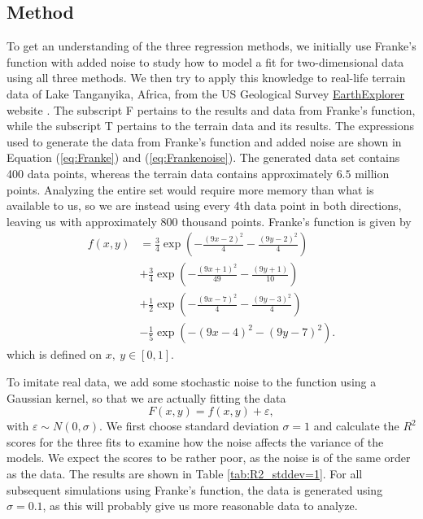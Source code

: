 \documentclass[a4paper, 10pt]{article}
\begin{document}
\begin{multicols}{2}
\section{Method}
To get an understanding of the three regression methods, we initially use Franke's function with added noise to study how to model a fit for two-dimensional data using all three methods. We then try to apply this knowledge to real-life terrain data of Lake Tanganyika, Africa, from the US Geological Survey \href{https://earthexplorer.usgs.gov/}{EarthExplorer}  website \cite{earthexplorer} .  The subscript F pertains to the results and data from Franke's function, while the subscript T pertains to the terrain data and its results.  The expressions used to generate the data from Franke's function and added noise are shown in Equation (\ref{eq:Franke}) and (\ref{eq:Frankenoise}). The generated data set contains 400 data points, whereas the terrain data contains approximately $6.5$ million points. Analyzing the entire set would require more memory than what is available to us, so we are instead using every 4th data point in both directions, leaving us with approximately 800 thousand points. 
Franke's function is given by
\begin{align}
f(x,y) &= \frac{3}{4}\exp{\left(-\frac{(9x-2)^2}{4}   - \frac{(9y-2)^2}{4}\right)} \nonumber\\
 &+\frac{3}{4}\exp{\left(-\frac{(9x+1)^2}{49}- \frac{(9y+1)}{10}\right)} \nonumber\\
 &+\frac{1}{2}\exp{\left(-\frac{(9x-7)^2}{4} - \frac{(9y-3)^2}{4}\right)} \nonumber\\
 &-\frac{1}{5}\exp{\left(-(9x-4)^2 - (9y-7)^2\right) }. \label{eq:Franke}
\end{align} which is defined on $x,\ y \in [0,1]$.

To imitate real data, we add some stochastic noise to the function using a Gaussian kernel, so that we are actually fitting the data 
\begin{equation}
F(x, y) = f(x, y) + \varepsilon \label{eq:Frankenoise},
\end{equation}
with $ \varepsilon \sim N(0, \sigma) $. We first choose standard deviation $\sigma=1$ and calculate the $R^2$ scores for the three fits to examine how the noise affects the variance of the models. We expect the scores to be rather poor, as the noise is of the same order as the data.  The results are shown in Table \ref{tab:R2_stddev=1}. For all subsequent simulations using Franke's function, the data is generated using $\sigma=0.1$, as this will probably give us more reasonable data to analyze. 


\end{multicols}
\end{document}
